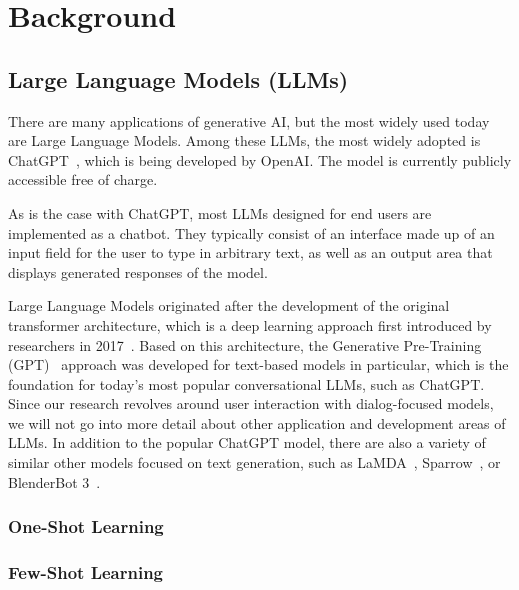 \section{Background}
\label{sec:background}

\subsection{Large Language Models (LLMs)}
\label{subsec:large-language-models-(llms)}

There are many applications of generative AI, but the most widely used today are Large Language Models.
Among these LLMs, the most widely adopted is ChatGPT~\cite{openai_chatgpt_2023}, which is being
developed by OpenAI\@.
The model is currently publicly accessible free of charge.

As is the case with ChatGPT, most LLMs designed for end users are implemented as a chatbot.
They typically consist of an interface made up of an input field for the user to type in arbitrary text, as well as
an output area that displays generated responses of the model.

Large Language Models originated after the development of the original transformer architecture,
which is a deep learning approach first introduced by researchers in 2017~\cite{vaswani_attention_2017}.
Based on this architecture, the Generative Pre-Training (GPT)~\cite{radford_improving_2018} approach
was developed for text-based models in particular, which is the foundation for today's most popular
conversational LLMs, such as ChatGPT\@.
Since our research revolves around user interaction with dialog-focused models, we will not go into
more detail about other application and development areas of LLMs.
In addition to the popular ChatGPT model, there are also a variety of similar other models focused on
text generation, such as LaMDA~\cite{thoppilan_lamda_2022}, Sparrow~\cite{glaese_improving_2022}, or
BlenderBot 3~\cite{shuster_blenderbot_2022}.




\subsubsection{One-Shot Learning}
\subsubsection{Few-Shot Learning}
